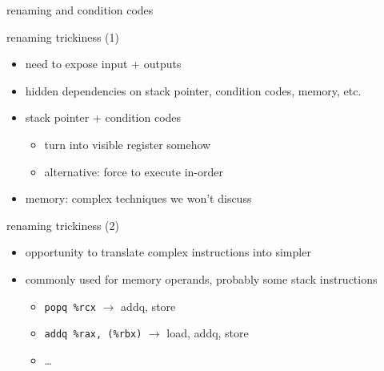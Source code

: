 \begin{frame}[fragile,label=renameCC]{renaming and condition codes}
\end{frame}

\begin{frame}[fragile,label=renamingTrickiness1]{renaming trickiness (1)}
    \begin{itemize}
    \item need to expose input + outputs
    \item hidden dependencies on stack pointer, condition codes, memory, etc.
    \item stack pointer + condition codes
        \begin{itemize}
        \item turn into visible register somehow
        \item alternative: force to execute in-order
        \end{itemize}
    \item memory: complex techniques we won't discuss
    \end{itemize}
\end{frame}

\begin{frame}[fragile,label=renamingTrickiness2]{renaming trickiness (2)}
    \begin{itemize}
    \item opportunity to translate complex instructions into simpler
    \item commonly used for memory operands, probably some stack instructions
        \begin{itemize}
        \item \lstinline|popq %rcx| $\rightarrow$ addq, store
        \item \lstinline|addq %rax, (%rbx)| $\rightarrow$ load, addq, store
        \item \ldots
        \end{itemize}
    \end{itemize}
\end{frame}

